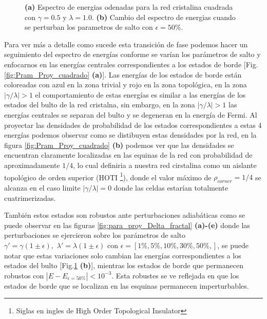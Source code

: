 \begin{figure}[tbh!]
\begin{subfigure}[b!]{0.45 \textwidth}
    \end{subfigure}
       \caption{\textbf{(a)} Espectro de energias odenadas para la red cristalina cuadrada con $\gamma = 0.5$ y $\lambda = 1.0$. \textbf{(b)} Cambio del espectro de energias cuando se perturban los parametros de salto con $\epsilon = 50\%$.}
       \label{fig:spectre_square_epsi}
\end{figure}


Para ver más a detalle como sucede esta transición de fase podemos hacer un seguimiento del espectro de energías conforme se varían los parámetros de salto y enfocarnos en las energías centrales correspondientes a los estados de borde [Fig.\ref{fig:Pram_Proy_cuadrado} \textbf{(a)}]. Las energías de los estados de borde están coloreadas con azul en la zona trivial y rojo en la zona topológica, en la zona $|\gamma/\lambda|>1$ el comportamiento de estas energías es similar a las energías de los estados del bulto de la red cristalna, sin embargo, en la zona $|\gamma/\lambda|>1$ las energías centrales se separan del bulto y se degeneran en la energía de Fermi. Al proyectar las densidades de probabilidad de los estados correspondientes a estas 4 energías podemos observar como se distibuyen estas densidades por la red, en la figura \ref{fig:Pram_Proy_cuadrado} \textbf{(b)} podemos ver que las densidades se encuentran claramente localizadas en las equinas de la red con probabilidad de aproximadamente $1/4$, lo cual definiria a nuestra red cirstalina como un aislante topológico de orden superior (HOTI \footnote{Siglas en ingles de High Order Topological Insulator}), donde el valor máximo de $\rho_{corner} = 1/4$ se alcanza en el caso limite $|\gamma/\lambda| = 0$ donde las celdas estarían totalmente cuatrimerizadas.




También estos estados son robustos ante perturbaciones adiabáticas como se puede observar en las figuras \ref{fig:para_proy_Delta_fractal} \textbf{(a)-(e)} donde las perturbaciones se ejercieron sobre los parámetros de salto $\gamma' = \gamma( 1 \pm \epsilon) ,\, \, \lambda' = \lambda( 1 \pm \epsilon)$ con $\epsilon = [1\%, 5\%, 10\%,30\%,50\%,]$, se puede notar que estas variaciones solo cambian las energías correspondientes a los estados del bulto [Fig.\ref{fig:spectre_square_epsi} \textbf{(b)}], mientras los estados de borde que permanecen robustos con $|E - E_{\epsilon = 50\%}| < 10^{-3}$. Esta robustes se ve reflejada en que los estados de borde que se localizan en las esquinas permanecen imperturbables.

